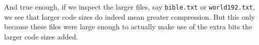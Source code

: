 \begin{refsection}
And true enough, if we inspect the larger files, say \verb|bible.txt|
or \verb|world192.txt|, we see that larger code sizes do indeed mean
greater compression. But this only because these files were large
enough to actually make use of the extra bits the larger code sizes
added.

\FloatBarrier

\printbibliography[heading=subbibliography]

\end{refsection}

